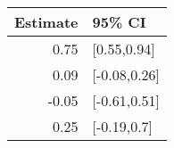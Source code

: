 \begin{tabular}{rl}
  \hline
Estimate & 95\% CI \\ 
  \hline
0.75 & [0.55,0.94] \\ 
  0.09 & [-0.08,0.26] \\ 
  -0.05 & [-0.61,0.51] \\ 
  0.25 & [-0.19,0.7] \\ 
   \hline
\end{tabular}

